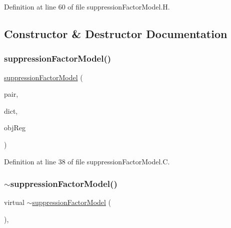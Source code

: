 Definition at line 60 of file suppression\+Factor\+Model.\+H.



\subsection{Constructor \& Destructor Documentation}
\mbox{\label{classFoam_1_1suppressionFactorModel_a3e1f6cc07fd21e09b54ad9a90926e52b}} 
\subsubsection{\texorpdfstring{suppression\+Factor\+Model()}{suppressionFactorModel()}}
{\footnotesize\ttfamily \hyperlink{classFoam_1_1suppressionFactorModel}{suppression\+Factor\+Model} (\begin{DoxyParamCaption}\item[{const \hyperlink{classFoam_1_1FSPair}{F\+S\+Pair} \&}]{pair,  }\item[{const dictionary \&}]{dict,  }\item[{const object\+Registry \&}]{obj\+Reg }\end{DoxyParamCaption})}



Definition at line 38 of file suppression\+Factor\+Model.\+C.

\mbox{\label{classFoam_1_1suppressionFactorModel_a528b1d2265798325a1d70ac0a032f273}} 
\subsubsection{\texorpdfstring{$\sim$suppression\+Factor\+Model()}{~suppressionFactorModel()}}
{\footnotesize\ttfamily virtual $\sim$\hyperlink{classFoam_1_1suppressionFactorModel}{suppression\+Factor\+Model} (\begin{DoxyParamCaption}{ }\end{DoxyParamCaption})\hspace{0.3cm}{\ttfamily [inline]}, {\ttfamily [virtual]}}



